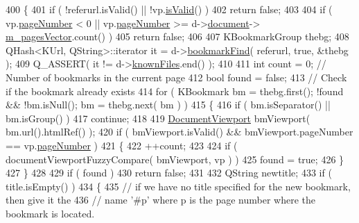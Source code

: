 \begin{DoxyCode}
400 \{
401     \textcolor{keywordflow}{if} ( !referurl.isValid() || !vp.\hyperlink{classOkular_1_1DocumentViewport_a13161b17f2d0b68bf033955f81d41584}{isValid}() )
402         \textcolor{keywordflow}{return} \textcolor{keyword}{false};
403 
404     \textcolor{keywordflow}{if} ( vp.\hyperlink{classOkular_1_1DocumentViewport_a122674d4a493e79b1aa5fd5c00e81c93}{pageNumber} < 0 || vp.\hyperlink{classOkular_1_1DocumentViewport_a122674d4a493e79b1aa5fd5c00e81c93}{pageNumber} >= d->\hyperlink{classBookmarkManager_1_1Private_a308b94ea2abb1e9c630fc534ec403903}{document}->
      \hyperlink{classOkular_1_1DocumentPrivate_a73b852d9a73ffe8061b66dbf9b290f17}{m\_pagesVector}.count() )
405         \textcolor{keywordflow}{return} \textcolor{keyword}{false};
406 
407     KBookmarkGroup thebg;
408     QHash<KUrl, QString>::iterator it = d->\hyperlink{classBookmarkManager_1_1Private_ae01a437da3410e1459293530bae155de}{bookmarkFind}( referurl, \textcolor{keyword}{true}, &thebg );
409     Q\_ASSERT( it != d->\hyperlink{classBookmarkManager_1_1Private_ad4ef503c3bf977fc59f04ea5c89b2968}{knownFiles}.end() );
410 
411     \textcolor{keywordtype}{int} count = 0; \textcolor{comment}{// Number of bookmarks in the current page}
412     \textcolor{keywordtype}{bool} found = \textcolor{keyword}{false};
413     \textcolor{comment}{// Check if the bookmark already exists}
414     \textcolor{keywordflow}{for} ( KBookmark bm = thebg.first(); !found && !bm.isNull(); bm = thebg.next( bm ) )
415     \{
416         \textcolor{keywordflow}{if} ( bm.isSeparator() || bm.isGroup() )
417             \textcolor{keywordflow}{continue};
418 
419         \hyperlink{classOkular_1_1DocumentViewport}{DocumentViewport} bmViewport( bm.url().htmlRef() );
420         \textcolor{keywordflow}{if} ( bmViewport.isValid() && bmViewport.pageNumber == vp.\hyperlink{classOkular_1_1DocumentViewport_a122674d4a493e79b1aa5fd5c00e81c93}{pageNumber} )
421         \{
422             ++count;
423 
424             \textcolor{keywordflow}{if} ( documentViewportFuzzyCompare( bmViewport, vp ) )
425                 found = \textcolor{keyword}{true};
426         \}
427     \}
428 
429     \textcolor{keywordflow}{if} ( found )
430         \textcolor{keywordflow}{return} \textcolor{keyword}{false};
431 
432     QString newtitle;
433     \textcolor{keywordflow}{if} ( title.isEmpty() )
434     \{
435         \textcolor{comment}{// if we have no title specified for the new bookmark, then give it the}
436         \textcolor{comment}{// name '#p' where p is the page number where the bookmark is located.}

\end{DoxyCode}
